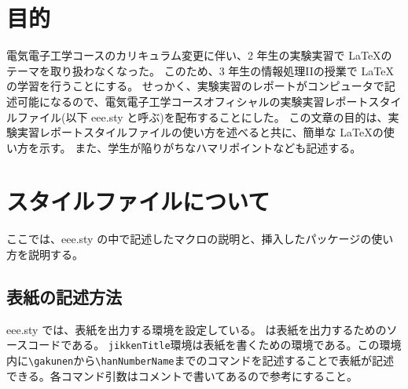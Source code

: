 \documentclass[11pt,dvipdfmx]{jarticle}
\begin{document}
\begin{jikkenTitle} %
 \subTitle{} %


\end{jikkenTitle}

\section{目的}

電気電子工学コースのカリキュラム変更に伴い、2 年生の実験実習で \LaTeX のテーマを取り扱わなくなった。
このため、3 年生の情報処理IIの授業で \LaTeX の学習を行うことにする。
せっかく、実験実習のレポートがコンピュータで記述可能になるので、電気電子工学コースオフィシャルの実験実習レポートスタイルファイル(以下 eee.sty と呼ぶ)を配布することにした。
この文章の目的は、実験実習レポートスタイルファイルの使い方を述べると共に、簡単な \LaTeX の使い方を示す。
また、学生が陥りがちなハマリポイントなども記述する。

\section{スタイルファイルについて}

ここでは、eee.sty の中で記述したマクロの説明と、挿入したパッケージの使い方を説明する。
\subsection{表紙の記述方法}

eee.sty では、表紙を出力する環境を設定している。
は表紙を出力するためのソースコードである。
\verb+jikkenTitle+環境は表紙を書くための環境である。この環境内に\verb+\gakunen+から\verb+\hanNumberName+までのコマンドを記述することで表紙が記述できる。各コマンド引数はコメントで書いてあるので参考にすること。
\end{document}
